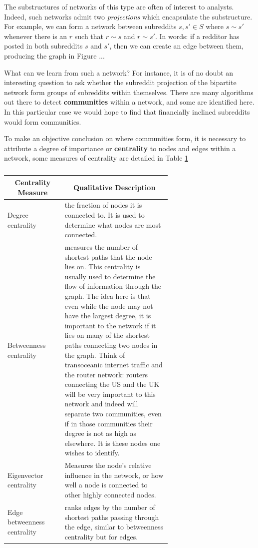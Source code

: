 \documentclass[twoside]{report}
\begin{document}
\begin{spacing}{1}
The substructures of networks of this type are often of interest to analysts. Indeed, such networks admit two \textit{projections} which encapsulate the substructure. For example, we can form a network between subreddits $s, s' \in S$ where $s \sim s'$ whenever there is an $r$ such that $r \sim s$ and $r\sim s'$. In words: if a redditor has posted in both subreddits $s$ and $s'$, then we can create an edge between them, producing the graph in Figure ... 

What can we learn from such a network? For instance, it is of no doubt an interesting question to ask whether the subreddit projection of the bipartite network form groups of subreddits within themselves. There are many algorithms out there to detect \textbf{communities} within a network, and some are identified here. In this particular case we would hope to find that financially inclined subreddits  would form communities. 

To make an objective conclusion on where communities form, it is necessary to attribute a degree of importance or \textbf{centrality} to nodes and edges within a network, some measures of centrality are detailed in Table \ref{table:centralityMeasures}

\begin{table}[htbp]
\centering
\begin{tabular}{|l|p{0.65\linewidth}|}
\hline
\multicolumn{1}{|c|}{\textbf{Centrality Measure}} & \multicolumn{1}{c|}{\textbf{Qualitative Description}}
\tabularnewline \hline
      Degree centrality & the fraction of nodes it is connected to. It is used to determine what nodes are most connected. \\
      \hline
      Betweenness  centrality & measures the number of shortest paths that the node lies on. This centrality is usually used to determine the flow of information through the graph. The idea here is that even while the node may not have the largest degree, it is important to the network if it lies on many of the shortest paths connecting two nodes in the graph. Think of transoceanic internet traffic and the router network: routers connecting the US and the UK will be very important to this network and indeed will separate two communities, even if in those communities their degree is not as high as elsewhere. It is these nodes one wishes to identify.\\
      \hline 
      Eigenvector centrality & Measures the node’s relative influence in the network, or how well a node is connected to other highly connected nodes. \\
      \hline 
      Edge betweenness centrality & ranks edges by the number of shortest paths passing through the edge, similar to betweenness centrality but for edges.
 \tabularnewline \hline
\end{tabular}
\caption{}
\label{table:centralityMeasures}   
\end{table}





\end{spacing}
\end{document}
